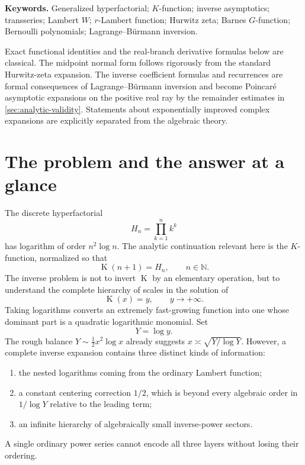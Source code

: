 \documentclass[11pt,oneside]{article}
\theoremstyle{plain}
\theoremstyle{definition}
\theoremstyle{remark}
\newcommand{\Kfun}{\operatorname{K}}
\newcommand{\N}{\mathbb{N}}
\begin{document}
\noindent\textbf{Keywords.}
Generalized hyperfactorial; \(K\)-function; inverse asymptotics; transseries;
Lambert \(W\); \(r\)-Lambert function; Hurwitz zeta; Barnes \(G\)-function;
Bernoulli polynomials; Lagrange--B\"urmann inversion.

\begin{statusbox}
Exact functional identities and the real-branch derivative formulas below are
classical.  The midpoint normal form follows rigorously from the standard
Hurwitz-zeta expansion.  The inverse coefficient formulas and recurrences are
formal consequences of Lagrange--B\"urmann inversion and become Poincar\'e
asymptotic expansions on the positive real ray by the remainder estimates in
\cref{sec:analytic-validity}.  Statements about exponentially improved complex
expansions are explicitly separated from the algebraic theory.
\end{statusbox}

{\small\tableofcontents}
\clearpage

\section{The problem and the answer at a glance}
\label{sec:overview}

The discrete hyperfactorial
\[
 H_n=\prod_{k=1}^{n}k^k
\]
has logarithm of order \(n^2\log n\).  The analytic continuation relevant here
is the \(K\)-function, normalized so that
\begin{equation}
 \Kfun(n+1)=H_n,\qquad n\in\N.
 \label{eq:integer-hyperfactorial}
\end{equation}
The inverse problem is not to invert \(\Kfun\) by an elementary operation, but
to understand the complete hierarchy of scales in the solution of
\begin{equation}
 \Kfun(x)=y,
 \qquad y\to+\infty.
 \label{eq:inverse-problem}
\end{equation}
Taking logarithms converts an extremely fast-growing function into one whose
dominant part is a quadratic logarithmic monomial.  Set
\begin{equation}
 Y=\log y.
 \label{eq:Ydef}
\end{equation}
The rough balance \(Y\sim \tfrac12 x^2\log x\) already suggests
\(x\asymp\sqrt{Y/\log Y}\).  However, a complete inverse expansion contains
three distinct kinds of information:
\begin{enumerate}
\item the nested logarithms coming from the ordinary Lambert function;
\item a constant centering correction \(1/2\), which is beyond every algebraic
      order in \(1/\log Y\) relative to the leading term;
\item an infinite hierarchy of algebraically small inverse-power sectors.
\end{enumerate}
A single ordinary power series cannot encode all three layers without losing
their ordering.
\end{document}
